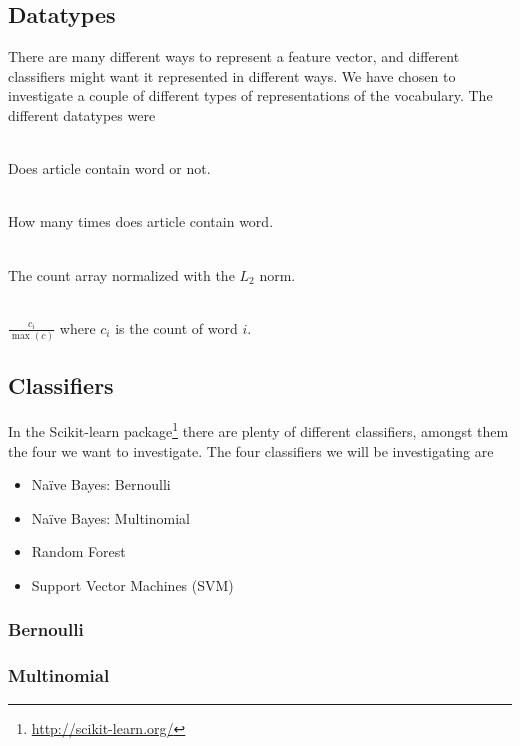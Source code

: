 \subsection{Datatypes}
There are many different ways to represent a feature vector, and different classifiers might want it represented in different ways. We have chosen to investigate a couple of different types of representations of the vocabulary. The different datatypes were
\begin{description}
\item[Binary:]\ \\Does article contain word or not.
\item[Count:]\ \\How many times does article contain word.
\item[$L_2$-normalized:]\ \\ The count array normalized with the $L_2$ norm. 
\item[Mapped value from 0 to 1:]\ \\ $\frac{c_i}{\max(c)}$ where $c_i$ is the count of word $i$.
\end{description}

\subsection{Classifiers}
In the Scikit-learn package\footnote{\url{http://scikit-learn.org/}} there are plenty of different classifiers, amongst them the four we want to investigate. The four classifiers we will be investigating are
\begin{itemize}[noitemsep,nolistsep]
\item Naïve Bayes: Bernoulli
\item Naïve Bayes: Multinomial
\item Random Forest 
\item Support Vector Machines (SVM)
\end{itemize}

\subsubsection{Bernoulli} %
\label{ssub:bernoulli}

\subsubsection{Multinomial} %
\label{ssub:multinomial}

